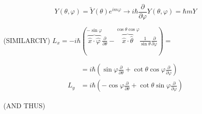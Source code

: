 $$
Y(\theta, \varphi)=\tilde{Y}(\theta) e^{i m \varphi} \rightarrow i \hbar \frac{\partial}{\partial \varphi} Y(\theta, \varphi)=\hbar m Y
$$

(SIMILARCIY) $L_{x}=-i \hbar(\overbrace{\hat{x} \cdot \hat{\varphi}}^{-\sin \varphi} \frac{\partial}{\partial \theta}-\overbrace{\hat{x} \cdot \hat{\theta}}^{\cos \theta \cos \varphi} \frac{1}{\sin \theta} \frac{\partial}{\partial \varphi})=$

$$
\begin{aligned}
& =i \hbar\left(\sin \varphi \frac{\partial}{\partial \theta}+\cot \theta \cos \varphi \frac{\partial}{\partial \varphi}\right) \\
L_{y} & =i \hbar\left(-\cos \varphi \frac{\partial}{\partial \theta}+\cot \theta \sin \varphi \frac{\partial}{\partial \varphi}\right)
\end{aligned}
$$

(AND THUS)


